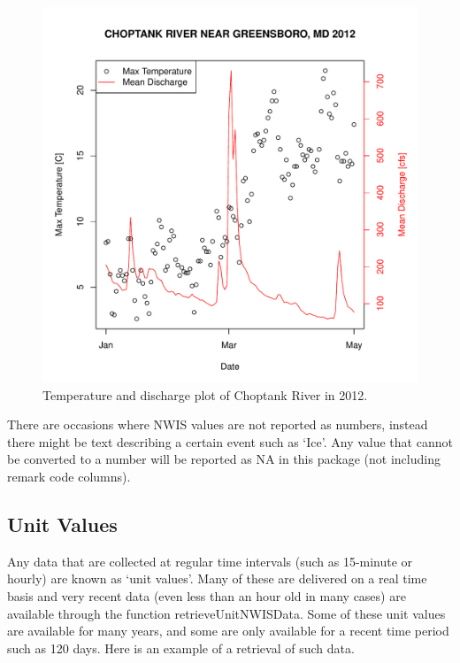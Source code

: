 \documentclass[a4paper,11pt]{article}\usepackage[]{graphicx}\usepackage[]{color}
\newenvironment{knitrout}{}{} %
\begin{document}
\begin{knitrout}
\begin{figure}[]
\includegraphics[width=1\linewidth,height=1\linewidth]{figure/getNWIStemperaturePlot} \caption[Temperature and discharge plot of Choptank River in 2012]{Temperature and discharge plot of Choptank River in 2012.\label{fig:getNWIStemperaturePlot}}
\end{figure}


\end{knitrout}



There are occasions where NWIS values are not reported as numbers, instead there might be text describing a certain event such as `Ice'.  Any value that cannot be converted to a number will be reported as NA in this package (not including remark code columns).

\FloatBarrier

\subsection{Unit Values}
\label{sec:usgsRT}
Any data that are collected at regular time intervals (such as 15-minute or hourly) are known as `unit values'. Many of these are delivered on a real time basis and very recent data (even less than an hour old in many cases) are available through the function retrieveUnitNWISData.  Some of these unit values are available for many years, and some are only available for a recent time period such as 120 days.  Here is an example of a retrieval of such data.  
\end{document}
